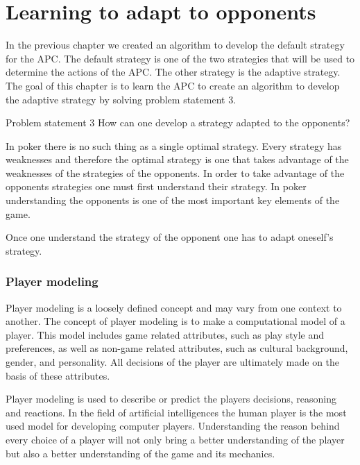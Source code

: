 \section{Learning to adapt to opponents}
\label{sec:part3}

In the previous chapter we created an algorithm to develop the default strategy for the APC. The default strategy is one of the two strategies that will be used to determine the actions of the APC. The other strategy is the adaptive strategy. \\

The goal of this chapter is to learn the APC to create an algorithm to develop the adaptive strategy by solving problem statement 3.

\vspace{4mm}
\begin{statementBox2}{Problem statement 3}
  How can one develop a strategy adapted to the opponents?
\end{statementBox2}
\vspace{4mm}

In poker there is no such thing as a single optimal strategy. Every strategy has weaknesses and therefore the optimal strategy is one that takes advantage of the weaknesses of the strategies of the opponents. In order to take advantage of the opponents strategies one must first understand their strategy. In poker understanding the opponents is one of the most important key elements of the game. 

Once one understand the strategy of the opponent one has to adapt oneself's strategy.



\subsubsection{Player modeling}
Player modeling is a loosely defined concept and may vary from one context to another. The concept of player modeling is to make a computational model of a player. This model includes game related attributes, such as play style and preferences, as well as non-game related attributes, such as cultural background, gender, and personality. All decisions of the player are ultimately made on the basis of these attributes. 

Player modeling is used to describe or predict the players decisions, reasoning and reactions. In the field of artificial intelligences the human player is the most used model for developing computer players. Understanding the reason behind every choice of a player will not only bring a better understanding of the player but also a better understanding of the game and its mechanics.

